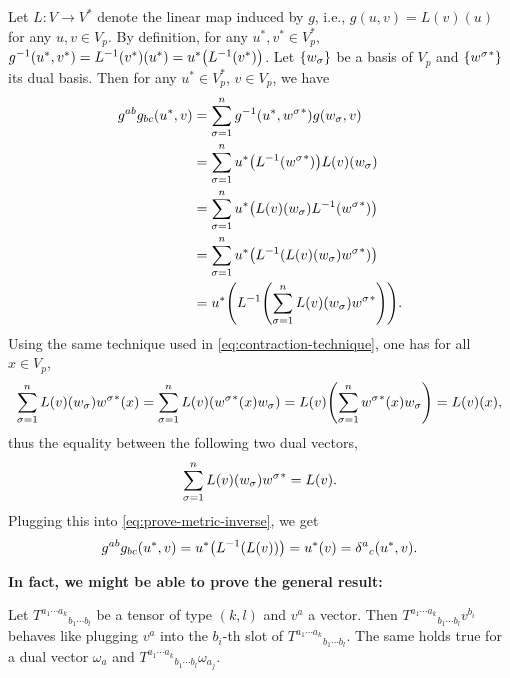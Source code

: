 \documentclass{note}
\numberwithin{equation}{chapter}
\begin{document}
Let $L\colon V\to V^*$ denote the linear map induced by $g$, i.e., $g(u, v) =
    L(v)(u)$ for any $u, v \in V_p$. By definition, for any $u^*, v^* \in V_p^*$,
$g^{-1}(u^*, v^*) = L^{-1}(v^*)(u^*) = u^*\prn{L^{-1}(v^*)}$. Let
$\set{w_\sigma}$ be a basis of $V_p$ and $\set{{w^\sigma}^*}$ its dual basis.
Then for any $u^* \in V_p^*$, $v \in V_p$, we have
\begin{align}
    g^{ab}g_{bc}(u^*, v)
     & = \sum_{\sigma=1}^n g^{-1}\prn{u^*, {w^\sigma}^*} g\prn{w_\sigma, v} \notag     \\
     & = \sum_{\sigma=1}^n u^*\prn{L^{-1}\prn{{w^\sigma}^*}} L(v)\prn{w_\sigma} \notag \\
     & = \sum_{\sigma=1}^n u^*\prn{L(v)\prn{w_\sigma}L^{-1}\prn{{w^\sigma}^*}} \notag  \\
     & = \sum_{\sigma=1}^n u^*\prn{L^{-1}\prn{L(v)\prn{w_\sigma}{w^\sigma}^*}} \notag  \\
     & = u^*\prn{L^{-1}\prn{\sum_{\sigma=1}^n L(v)\prn{w_\sigma}{w^\sigma}^*}}.
    \label{eq:prove-metric-inverse}
\end{align}
Using the same technique used in \eqref{eq:contraction-technique}, one has for
all $x \in V_p$,
\begin{equation*}
    \sum_{\sigma=1}^n L(v)\prn{w_\sigma}{w^\sigma}^*(x) = \sum_{\sigma=1}^n
    L(v)\prn{{w^\sigma}^*(x) w_\sigma} = L(v)\prn{\sum_{\sigma=1}^n {w^\sigma}^*(x)
    w_\sigma} = L(v)(x),
\end{equation*}
thus the equality between the following two dual vectors,
\begin{equation*}
    \sum_{\sigma=1}^n L(v)\prn{w_\sigma}{w^\sigma}^* = L(v).
\end{equation*}
Plugging this into \eqref{eq:prove-metric-inverse}, we get
\begin{equation*}
    g^{ab}g_{bc}(u^*, v) = u^*\prn{L^{-1}(L(v))} = u^*(v) =
    {\delta^a}_c\prn{u^*,v}.
\end{equation*}

{\bfseries In fact, we might be able to prove the general result:}
\begin{lemma*}
    Let ${T^{a_1\cdots a_k}}_{b_1\cdots b_l}$ be a tensor of type $(k,l)$ and $v^a$
    a vector. Then ${T^{a_1\cdots a_k}}_{b_1\cdots b_l}v^{b_i}$ behaves like
    plugging $v^a$ into the $b_i$-th slot of ${T^{a_1\cdots a_k}}_{b_1\cdots b_l}$.
    The same holds true for a dual vector $\omega_a$ and ${T^{a_1\cdots
                        a_k}}_{b_1\cdots b_l}\omega_{a_j}$.
\end{lemma*}
\end{document}
